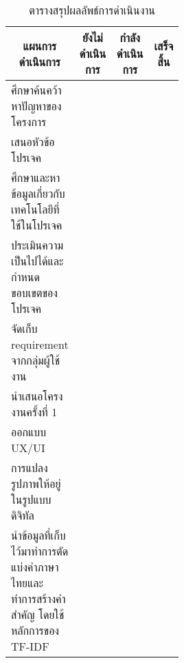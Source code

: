 \begin{table}[H]
\caption{ตารางสรุปผลลัพธ์การดำเนินงาน}\label{tbl:milestone}
\begin{tabular}{|p{0.5\linewidth}|l|l|l|}
\hline
\multicolumn{1}{|c|}{แผนการดำเนินการ}                                                & \multicolumn{1}{c|}{ยังไม่ดำเนินการ} & \multicolumn{1}{c|}{กำลังดำเนินการ} & \multicolumn{1}{c|}{เสร็จสิ้น} \\ \hline
ศึกษาค้นคว้าหาปัญหาของโครงการ                                                        &                                      &                                     & \cellcolor[HTML]{92D050}       \\ \hline
เสนอหัวข้อโปรเจค                                                                     &                                      &                                     & \cellcolor[HTML]{92D050}       \\ \hline
ศึกษาและหาข้อมูลเกี่ยวกับเทคโนโลยีที่ใช้ในโปรเจค                                     &                                      &                                     & \cellcolor[HTML]{92D050}       \\ \hline
ประเมินความเป็นไปได้และกำหนดขอบเขตของโปรเจค                                          &                                      &                                     & \cellcolor[HTML]{92D050}       \\ \hline
จัดเก็บ requirement จากกลุ่มผู้ใช้งาน                                                &                                      &                                     & \cellcolor[HTML]{92D050}       \\ \hline
นำเสนอโครงงานครั้งที่ 1                                                              &                                      &                                     & \cellcolor[HTML]{92D050}       \\ \hline
ออกแบบ UX/UI                                                                         &                                      &                                     & \cellcolor[HTML]{92D050}       \\ \hline
การแปลงรูปภาพให้อยู่ในรูปแบบดิจิทัล                                                        &                                      &                                     & \cellcolor[HTML]{92D050}       \\ \hline
นำข้อมูลที่เก็บไว้มาทำการตัดแบ่งคำภาษาไทยและทำการสร้างคำสำคัญ โดยใช้หลักการของ TF-IDF &                                      &                                     & \cellcolor[HTML]{92D050}       \\ \hline

\end{tabular}
\end{table}
